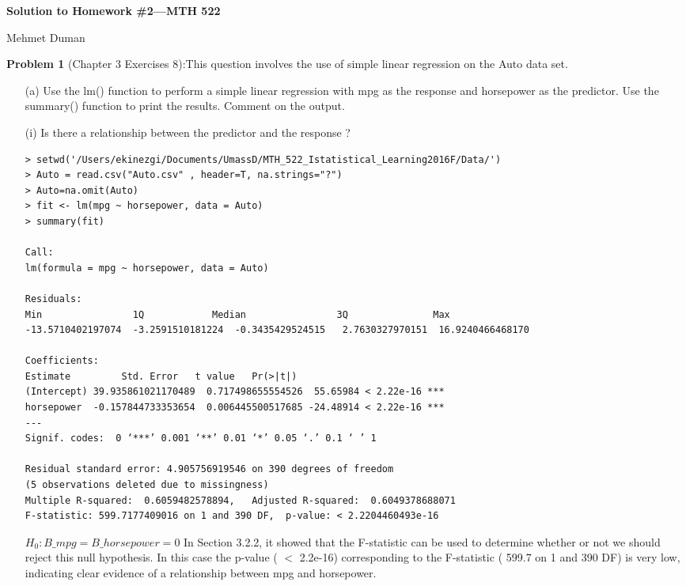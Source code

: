 \documentclass{article}
\begin{document}
\begin{center}
{\Large {\bf Solution to Homework \#2---MTH 522} }

Mehmet Duman
\end{center}

{\bf Problem 1} (Chapter 3 Exercises 8):This question involves the use of simple linear regression on the Auto data set.

\begin{itemize}
\item[(a)]  Use the lm() function to perform a simple linear regression with mpg as the response and horsepower as the predictor. Use the summary() function to print the results. Comment on the output.

\item[(i)] Is there a relationship between the predictor and the response ?


\begin{program}
	\begin{verbatim}
> setwd('/Users/ekinezgi/Documents/UmassD/MTH_522_Istatistical_Learning2016F/Data/')
> Auto = read.csv("Auto.csv" , header=T, na.strings="?")
> Auto=na.omit(Auto)
> fit <- lm(mpg ~ horsepower, data = Auto)
> summary(fit)

Call:
lm(formula = mpg ~ horsepower, data = Auto)

Residuals:
Min                1Q            Median                3Q               Max 
-13.5710402197074  -3.2591510181224  -0.3435429524515   2.7630327970151  16.9240466468170 

Coefficients:
Estimate         Std. Error   t value   Pr(>|t|)    
(Intercept) 39.935861021170489  0.717498655554526  55.65984 < 2.22e-16 ***
horsepower  -0.157844733353654  0.006445500517685 -24.48914 < 2.22e-16 ***
---
Signif. codes:  0 ‘***’ 0.001 ‘**’ 0.01 ‘*’ 0.05 ‘.’ 0.1 ‘ ’ 1

Residual standard error: 4.905756919546 on 390 degrees of freedom
(5 observations deleted due to missingness)
Multiple R-squared:  0.6059482578894,	Adjusted R-squared:  0.6049378688071 
F-statistic: 599.7177409016 on 1 and 390 DF,  p-value: < 2.2204460493e-16
\end{verbatim}
\end{program}


$H_0 : B\_mpg = B\_horsepower = 0$
\newline
In Section 3.2.2, it showed that the F-statistic can be used to determine whether or not we should reject this null hypothesis. In this case the p-value ( $<$ 2.2e-16)  corresponding to the F-statistic ( 599.7 on 1 and 390 DF)  is very low, indicating clear evidence of a relationship between mpg and horsepower.




\end{itemize}
\end{document}
